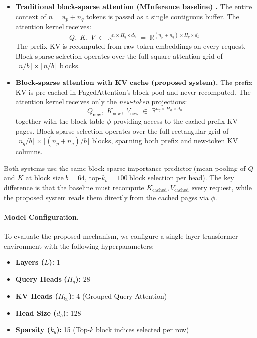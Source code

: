 \documentclass{article}
\begin{document}
\begin{itemize}
  \item \textbf{Traditional block-sparse attention (MInference baseline)
    \cite{minference}.} The entire context of $n = n_p + n_q$ tokens is
    passed as a single contiguous buffer. The attention kernel receives:
    \[
      Q,\; K,\; V \;\in\; \mathbb{R}^{n \times H_q \times d_h}
      \;=\; \mathbb{R}^{(n_p + n_q) \times H_q \times d_h}
    \]
    The prefix KV is recomputed from raw token embeddings on every request.
    Block-sparse selection operates over the full square attention grid of
    $\lceil n/b \rceil \times \lceil n/b \rceil$ blocks.

  \item \textbf{Block-sparse attention with KV cache (proposed system).}
    The prefix KV is pre-cached in PagedAttention's block pool and never
    recomputed. The attention kernel receives only the \textit{new-token}
    projections:
    \[
      Q_{\text{new}},\; K_{\text{new}},\; V_{\text{new}}
      \;\in\; \mathbb{R}^{n_q \times H_q \times d_h}
    \]
    together with the block table $\phi$ providing access to the cached
    prefix KV pages. Block-sparse selection operates over the full
    rectangular grid of $\lceil n_q/b \rceil \times \lceil (n_p+n_q)/b \rceil$
    blocks, spanning both prefix and new-token KV columns.
\end{itemize}

Both systems use the same block-sparse importance predictor (mean pooling
of $Q$ and $K$ at block size $b = 64$, top-$k_b = 100$ block selection
per head). The key difference is that the baseline must recompute
$K_{\text{cached}}, V_{\text{cached}}$ every request, while the proposed
system reads them directly from the cached pages via $\phi$.

\paragraph{Model Configuration.}
To evaluate the proposed mechanism, we configure a single-layer transformer environment with the following hyperparameters:
\begin{itemize}
    \item \textbf{Layers ($L$):} 1
    \item \textbf{Query Heads ($H_q$):} 28
    \item \textbf{KV Heads ($H_{kv}$):} 4 (Grouped-Query Attention)
    \item \textbf{Head Size ($d_h$):} 128
    \item \textbf{Sparsity ($k_b$):} 15 (Top-$k$ block indices selected per row)
\end{itemize}
\end{document}
